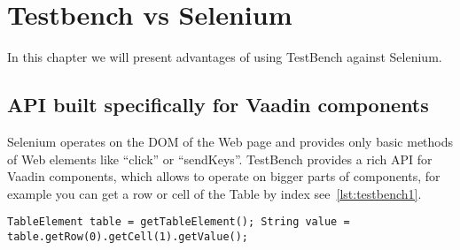 \chapter{Testbench vs Selenium}
\label{ch:testbenchvsselenium}
In this chapter we will present advantages of using TestBench against Selenium.

\section{API built specifically for Vaadin components}
Selenium operates on the DOM of the Web page and provides only basic methods of
Web elements like ``click'' or ``sendKeys''. TestBench provides a rich API for
Vaadin components, which allows to operate on bigger parts of components, for
 example you can get a row or cell of the Table by index
 see~\ref{lst:testbench1}.
  	\lstset{language=Java}
  	\begin{lstlisting}[caption=Get Vaadin Table cell Value,label={lst:testbench1}]
TableElement table = getTableElement(); String value = table.getRow(0).getCell(1).getValue();
	\end{lstlisting}
	
	